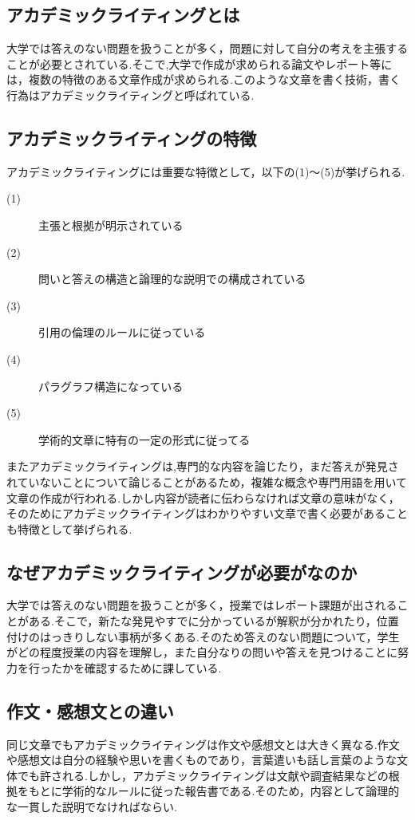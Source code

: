 \documentclass[a4j,12pt]{jarticle}
\begin{document}
\subsection{アカデミックライティングとは}
大学では答えのない問題を扱うことが多く，問題に対して自分の考えを主張することが必要とされている.そこで,大学で作成が求められる論文やレポート等には，複数の特徴のある文章作成が求められる.このような文章を書く技術，書く行為はアカデミックライティングと呼ばれている\cite{ren2}.
\subsection{アカデミックライティングの特徴}
アカデミックライティングには重要な特徴として，以下の(1)〜(5)が挙げられる.
\begin{description}
  \item[(1)] 主張と根拠が明示されている
  \item[(2)] 問いと答えの構造と論理的な説明での構成されている
  \item[(3)] 引用の倫理のルールに従っている
  \item[(4)] パラグラフ構造になっている
  \item[(5)] 学術的文章に特有の一定の形式に従ってる
 \end{description}
 
 またアカデミックライティングは,専門的な内容を論じたり，まだ答えが発見されていないことについて論じることがあるため，複雑な概念や専門用語を用いて文章の作成が行われる.しかし内容が読者に伝わらなければ文章の意味がなく，そのためにアカデミックライティングはわかりやすい文章で書く必要があることも特徴として挙げられる\cite{ren7}.
 
\newpage
\subsection{なぜアカデミックライティングが必要がなのか}
大学では答えのない問題を扱うことが多く，授業ではレポート課題が出されることがある.そこで，新たな発見やすでに分かっているが解釈が分かれたり，位置付けのはっきりしない事柄が多くある.そのため答えのない問題について，学生がどの程度授業の内容を理解し，また自分なりの問いや答えを見つけることに努力を行ったかを確認するために課している.

\subsection{作文・感想文との違い}
同じ文章でもアカデミックライティングは作文や感想文とは大きく異なる.作文や感想文は自分の経験や思いを書くものであり，言葉遣いも話し言葉のような文体でも許される.しかし，アカデミックライティングは文献や調査結果などの根拠をもとに学術的なルールに従った報告書である.そのため，内容として論理的な一貫した説明でなければならい.
\end{document}
